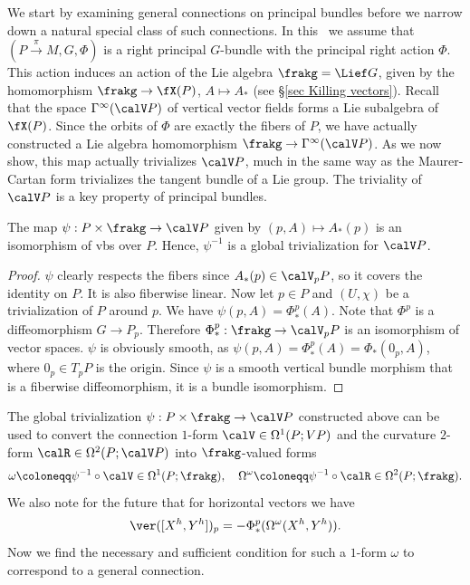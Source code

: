We start by examining general connections on principal bundles before we narrow down a natural special class of such connections. In this \sect\ we assume that $(P\overset{\pi}{\to}M,G,\Phi)$ is a right principal $G$-bundle with the principal right action $\Phi$. This action induces an action of the Lie algebra $\frakg=\Lief G$, given by the homomorphism $\frakg\to \fX(P)$, $A\mapsto A_\ast$ (see \S\ref{sec Killing vectors}). Recall that the space $\Gamma^\infty(\calV P)$ of vertical vector fields forms a Lie subalgebra of $\fX(P)$. Since the orbits of $\Phi$ are exactly the fibers of $P$, we have actually constructed a Lie algebra homomorphism $\frakg\to \Gamma^\infty(\calV P)$. As we now show, this map actually trivializes $\calV P$, much in the same way as the Maurer-Cartan form trivializes the tangent bundle of a Lie group. The triviality of $\calV P$ is a key property of principal bundles.

\begin{prop}[{{\cite[Lem.~1.3.1]{RS2}}}]\label{lem 1.3.1 RS2}
    The map $\psi:P\times\frakg\to \calV P$ given by $(p,A)\mapsto A_\ast(p)$ is an isomorphism of \glspl{vb} over $P$. Hence, $\psi^{-1}$ is a global trivialization for $\calV P$.
\end{prop}
\begin{proof}
    $\psi$ clearly respects the fibers since $A_\ast(p)\in \calV_pP$, so it covers the identity on $P$. It is also fiberwise linear. Now let $p\in P$ and $(U,\chi)$ be a trivialization of $P$ around $p$. We have $\psi(p,A)=\Phi^p_{\ast}(A)$. Note that $\Phi^p$ is a diffeomorphism $G\to P_p$. Therefore $\Phi^{p}_\ast:\frakg\to \calV_pP$ is an isomorphism of vector spaces. $\psi$ is obviously smooth, as $\psi(p,A)=\Phi^p_\ast(A)=\Phi_\ast(0_p,A)$, where $0_p\in T_pP$ is the origin. Since $\psi$ is a smooth vertical bundle morphism that is a fiberwise diffeomorphism, it is a bundle isomorphism.
\end{proof}


The global trivialization $\psi:P\times\frakg\to \calV P$ constructed above can be used to convert the connection $1$-form $\calV\in\Omega^1(P;VP)$ and the curvature $2$-form $\calR\in \Omega^2(P;\calV P)$ into $\frakg$-valued forms
 \[\omega\coloneqq \psi^{-1}\circ \calV \in\Omega^1(P;\frakg),\quad \Omega^\omega\coloneqq \psi^{-1}\circ \calR\in \Omega^2(P;\frakg).\]
We also note for the future that for horizontal vectors we have
\[\ver([X^h,Y^h])_p=-\Phi^p_\ast(\Omega^\omega(X^h,Y^h)).\label{eq 1.4.5 RS2}\]
Now we find the necessary and sufficient condition for such a $1$-form $\omega$ to correspond to a general connection.

